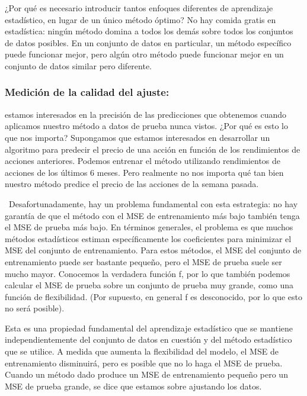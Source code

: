 \documentclass[
  letterpaper,
  DIV=11,
  numbers=noendperiod]{scrartcl}
\begin{document}
¿Por qué es necesario introducir tantos enfoques diferentes de
aprendizaje estadístico, en lugar de un único método óptimo? No hay
comida gratis en estadística: ningún método domina a todos los demás
sobre todos los conjuntos de datos posibles. En un conjunto de datos en
particular, un método específico puede funcionar mejor, pero algún otro
método puede funcionar mejor en un conjunto de datos similar pero
diferente.

\hypertarget{mediciuxf3n-de-la-calidad-del-ajuste}{%
\subsubsection{\texorpdfstring{\textbf{Medición de la calidad del
ajuste:}}{Medición de la calidad del ajuste:}}\label{mediciuxf3n-de-la-calidad-del-ajuste}}

estamos interesados en la precisión de las predicciones que obtenemos
cuando aplicamos nuestro método a datos de prueba nunca vistos. ¿Por qué
es esto lo que nos importa? Supongamos que estamos interesados en
desarrollar un algoritmo para predecir el precio de una acción en
función de los rendimientos de acciones anteriores. Podemos entrenar el
método utilizando rendimientos de acciones de los últimos 6 meses. Pero
realmente no nos importa qué tan bien nuestro método predice el precio
de las acciones de la semana pasada.

~Desafortunadamente, hay un problema fundamental con esta estrategia: no
hay garantía de que el método con el MSE de entrenamiento más bajo
también tenga el MSE de prueba más bajo. En términos generales, el
problema es que muchos métodos estadísticos estiman específicamente los
coeficientes para minimizar el MSE del conjunto de entrenamiento. Para
estos métodos, el MSE del conjunto de entrenamiento puede ser bastante
pequeño, pero el MSE de prueba suele ser mucho mayor. Conocemos la
verdadera función f, por lo que también podemos calcular el MSE de
prueba sobre un conjunto de prueba muy grande, como una función de
flexibilidad. (Por supuesto, en general f es desconocido, por lo que
esto no será posible).

Esta es una propiedad fundamental del aprendizaje estadístico que se
mantiene independientemente del conjunto de datos en cuestión y del
método estadístico que se utilice. A medida que aumenta la flexibilidad
del modelo, el MSE de entrenamiento disminuirá, pero es posible que no
lo haga el MSE de prueba. Cuando un método dado produce un MSE de
entrenamiento pequeño pero un MSE de prueba grande, se dice que estamos
sobre ajustando los datos.
\end{document}
